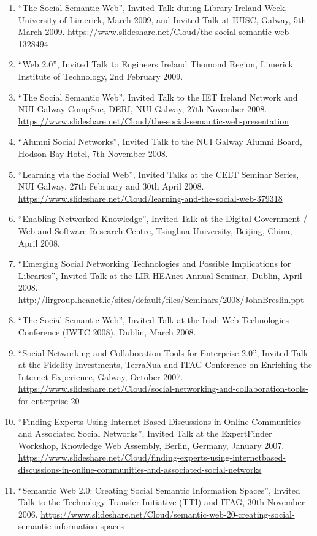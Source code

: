 \documentclass[10pt,a4paper]{res} %
\begin{document}
\begin{resume}
\begin{enumerate}
\item ``The Social Semantic Web'', Invited Talk during Library Ireland Week, University of Limerick, March 2009, and Invited Talk at IUISC, Galway, 5th March 2009. \url{https://www.slideshare.net/Cloud/the-social-semantic-web-1328494}
\item ``Web 2.0'', Invited Talk to Engineers Ireland Thomond Region, Limerick Institute of Technology, 2nd February 2009. %
\item ``The Social Semantic Web'', Invited Talk to the IET Ireland Network and NUI Galway CompSoc, DERI, NUI Galway, 27th November 2008. \url{https://www.slideshare.net/Cloud/the-social-semantic-web-presentation}
\item ``Alumni Social Networks'', Invited Talk to the NUI Galway Alumni Board, Hodson Bay Hotel, 7th November 2008.
\item ``Learning via the Social Web'', Invited Talks at the CELT Seminar Series, NUI Galway, 27th February and 30th April 2008. \url{https://www.slideshare.net/Cloud/learning-and-the-social-web-379318}
\item ``Enabling Networked Knowledge'', Invited Talk at the Digital Government / Web and Software Research Centre, Tsinghua University, Beijing, China, April 2008. %
\item ``Emerging Social Networking Technologies and Possible Implications for Libraries'', Invited Talk at the LIR HEAnet Annual Seminar, Dublin, April 2008. \url{http://lirgroup.heanet.ie/sites/default/files/Seminars/2008/JohnBreslin.ppt}
\item ``The Social Semantic Web'', Invited Talk at the Irish Web Technologies Conference (IWTC 2008), Dublin, March 2008. %
\item ``Social Networking and Collaboration Tools for Enterprise 2.0'', Invited Talk at the Fidelity Investments, TerraNua and ITAG Conference on Enriching the Internet Experience, Galway, October 2007. \url{https://www.slideshare.net/Cloud/social-networking-and-collaboration-tools-for-enterprise-20}
\item ``Finding Experts Using Internet-Based Discussions in Online Communities and Associated Social Networks'', Invited Talk at the ExpertFinder Workshop, Knowledge Web Assembly, Berlin, Germany, January 2007. \url{https://www.slideshare.net/Cloud/finding-experts-using-internetbased-discussions-in-online-communities-and-associated-social-networks}
\item ``Semantic Web 2.0: Creating Social Semantic Information Spaces'', Invited Talk to the Technology Transfer Initiative (TTI) and ITAG, 30th November 2006. \url{https://www.slideshare.net/Cloud/semantic-web-20-creating-social-semantic-information-spaces}

\end{enumerate}
\end{resume}
\end{document}
